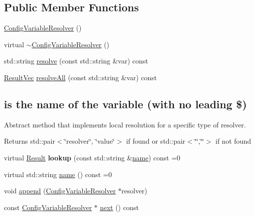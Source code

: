 \subsection*{Public Member Functions}
\begin{DoxyCompactItemize}
\item 
\hyperlink{classtheoria_1_1config_1_1ConfigVariableResolver_a90e26596be3efc1597909fd615a6a286}{Config\+Variable\+Resolver} ()
\item 
virtual \hyperlink{classtheoria_1_1config_1_1ConfigVariableResolver_ac395c02cf0dc162c093bfda494e3af0b}{$\sim$\+Config\+Variable\+Resolver} ()
\item 
std\+::string \hyperlink{classtheoria_1_1config_1_1ConfigVariableResolver_acb155f953e0d353cbd4966ae0d6e50da}{resolve} (const std\+::string \&var) const
\item 
\hyperlink{classtheoria_1_1config_1_1ConfigVariableResolver_a2d92a11d55181183ce4071566437f01b}{Result\+Vec} \hyperlink{classtheoria_1_1config_1_1ConfigVariableResolver_a406e1024b865b1749c920c83b774b745}{resolve\+All} (const std\+::string \&var) const
\end{DoxyCompactItemize}
\subsection*{is the name of the variable (with no leading \textquotesingle{}\$\textquotesingle{})}
\label{_amgrpa55251cdd20cd6c833ba352b7e8d9b84}%
Abstract method that implements local resolution for a specific type of resolver.

\begin{DoxyReturn}{Returns}
std\+::pair$<$\char`\"{}\textquotesingle{}resolver\textquotesingle{}\char`\"{}, \char`\"{}\textquotesingle{}value\textquotesingle{}\char`\"{}$>$ if found or std\+::pair$<$\char`\"{}\char`\"{},\char`\"{}\char`\"{}$>$ if not found 
\end{DoxyReturn}
\begin{DoxyCompactItemize}
\item 
\mbox{\label{classtheoria_1_1config_1_1ConfigVariableResolver_a85e75133c0fdd67dd8b1d8e678f46ca8}} 
virtual \hyperlink{classtheoria_1_1config_1_1ConfigVariableResolver_af27a85262d802c9ad4ecb1179efaf447}{Result} {\bfseries lookup} (const std\+::string \&\hyperlink{classtheoria_1_1config_1_1ConfigVariableResolver_a026bda729faf988eaef334a45ec92303}{name}) const =0
\item 
virtual std\+::string \hyperlink{classtheoria_1_1config_1_1ConfigVariableResolver_a026bda729faf988eaef334a45ec92303}{name} () const =0
\item 
void \hyperlink{classtheoria_1_1config_1_1ConfigVariableResolver_aedd40aea06645632c2b380c0181c563b}{append} (\hyperlink{classtheoria_1_1config_1_1ConfigVariableResolver}{Config\+Variable\+Resolver} $\ast$resolver)
\item 
const \hyperlink{classtheoria_1_1config_1_1ConfigVariableResolver}{Config\+Variable\+Resolver} $\ast$ \hyperlink{classtheoria_1_1config_1_1ConfigVariableResolver_a2861f6405c8b8e6c8c267dd490c46d2a}{next} () const
\end{DoxyCompactItemize}


